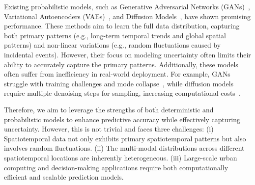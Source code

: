 Existing probabilistic models, such as Generative Adversarial Networks (GANs)~\cite{goodfellow2020generative,gao2022generative}, Variational Autoencoders (VAEs)~\cite{kingma2013auto,li2022generative}, and Diffusion Models~\cite{ho2020denoising,tashiro2021csdi}, have shown promising performance. 
These methods aim to learn the full data distribution, capturing both primary patterns (e.g., long-term temporal trends and global spatial patterns) and non-linear variations (e.g., random fluctuations caused by incidental events). However, their focus on modeling uncertainty often limits their ability to accurately capture the primary patterns.
Additionally, these models often suffer from inefficiency in real-world deployment. For example, GANs struggle with training challenges and mode collapse~\cite{goodfellow2020generative,brophy2021generative}, while diffusion models require multiple denoising steps for sampling, increasing computational costs~\cite{tashiro2021csdi,ruhling2023dyffusion,yuan2023spatio}.


Therefore, we aim to leverage the strengths of both deterministic and probabilistic models to enhance predictive accuracy while effectively capturing uncertainty. However, this is not trivial and faces three challenges: (i) Spatiotemporal data not only exhibits primary spatiotemporal patterns but also involves random fluctuations. (ii) The multi-modal distributions across different spatiotemporal locations are inherently heterogeneous. (iii) Large-scale urban computing and decision-making applications require both computationally efficient and scalable prediction models.



